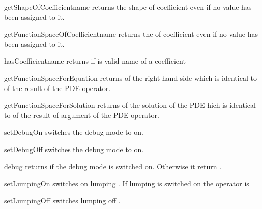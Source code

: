 \begin{methoddesc}[LinearPDE]{getShapeOfCoefficient}{name}
returns the shape of coefficient  even if no value has been assigned to it.
\end{methoddesc}


\begin{methoddesc}[LinearPDE]{getFunctionSpaceOfCoefficient}{name}
returns the \FunctionSpace of coefficient  even if no value has been assigned to it.
\end{methoddesc}

\begin{methoddesc}[LinearPDE]{hasCoefficient}{name}
returns \True if  is valid name of a coefficient
\end{methoddesc}


\begin{methoddesc}[LinearPDE]{getFunctionSpaceForEquation}{}
returns \FunctionSpace of the right hand side which is identical to \FunctionSpace of 
the result of the PDE operator.
\end{methoddesc}

\begin{methoddesc}[LinearPDE]{getFunctionSpaceForSolution}{}
returns \FunctionSpace of the solution of the PDE hich is identical to \FunctionSpace of 
the result of argument of the PDE operator.
\end{methoddesc}

\begin{methoddesc}[LinearPDE]{setDebugOn}{}
switches the debug mode to on.
\end{methoddesc}

\begin{methoddesc}[LinearPDE]{setDebugOff}{}
switches the debug mode to on.
\end{methoddesc}

\begin{methoddesc}[LinearPDE]{debug}{}
returns \True if the debug mode is switched on. Otherwise it return \False.
\end{methoddesc}

\begin{methoddesc}[LinearPDE]{setLumpingOn}{}
switches on lumping . If lumping is switched on 
the operator is 
\end{methoddesc}


\begin{methoddesc}[LinearPDE]{setLumpingOff}
switches lumping off .
\end{methoddesc}

